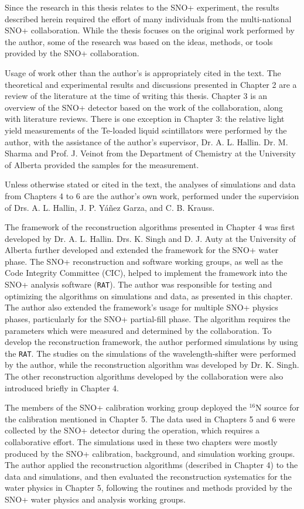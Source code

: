 Since the research in this thesis relates to the SNO+ experiment, the results described herein required the effort of many individuals from the multi-national SNO+ collaboration. While the thesis focuses on the original work performed by the author, some of the research was based on the ideas, methods, or tools provided by the SNO+ collaboration.

Usage of work other than the author's is appropriately cited in the text. The theoretical and experimental results and discussions presented in Chapter 2 are a review of the literature at the time of writing this thesis. Chapter 3 is an overview of the SNO+ detector based on the work of the collaboration, along with literature reviews. There is one exception in Chapter 3: the relative light yield measurements of the Te-loaded liquid scintillators were performed by the author, with the assistance of the author's supervisor, Dr. A. L. Hallin. Dr. M. Sharma and Prof. J. Veinot from the Department of Chemistry at the University of Alberta provided the samples for the measurement.

Unless otherwise stated or cited in the text, the analyses of simulations and data from Chapters 4 to 6 are the author's own work, performed under the supervision of Drs. A. L. Hallin, J. P. Y\'{a}\~{n}ez Garza, and C. B. Krauss.

The framework of the reconstruction algorithms presented in Chapter 4 was first developed by Dr. A. L. Hallin. Drs. K. Singh and D. J. Auty at the University of Alberta further developed and extended the framework for the SNO+ water phase. The SNO+ reconstruction and software working groups, as well as the Code Integrity Committee (CIC), helped to implement the framework into the SNO+ analysis software (\texttt{RAT}). The author was responsible for testing and optimizing the algorithms on simulations and data, as presented in this chapter. The author also extended the framework's usage for multiple SNO+ physics phases, particularly for the SNO+ partial-fill phase. The algorithm requires the parameters which were measured and determined by the collaboration. To develop the reconstruction framework, the author performed simulations by using the \texttt{RAT}. The studies on the simulations of the wavelength-shifter were performed by the author, while the reconstruction algorithm was developed by Dr. K. Singh. The other reconstruction algorithms developed by the collaboration were also introduced briefly in Chapter 4.

The members of the SNO+ calibration working group deployed the $^{16}$N source for the calibration mentioned in Chapter 5. The data used in Chapters 5 and 6 were collected by the SNO+ detector during the operation, which requires a collaborative effort. The simulations used in these two chapters were mostly produced by the SNO+ calibration, background, and simulation working groups. The author applied the reconstruction algorithms (described in Chapter 4) to the data and simulations, and then evaluated the reconstruction systematics for the water physics in Chapter 5, following the routines and methods provided by the SNO+ water physics and analysis working groups.


